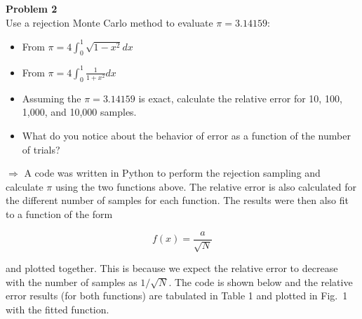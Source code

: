 \documentclass[10pt]{article}
\begin{document}
%
%
%

\newpage
\noindent \textbf{Problem 2}\\
Use a rejection Monte Carlo method to evaluate $\pi = 3.14159$:

\begin{itemize}
	\item From $\pi = 4 \int_0^1 \sqrt{1-x^2} dx$
	\item From $\pi = 4 \int_0^1 \frac{1}{1+x^2} dx$
	\item Assuming the $\pi = 3.14159$ is exact, calculate the relative error for 10, 100, 1,000, and 10,000 samples.
	\item What do you notice about the behavior of error as a function of the number of trials?
\end{itemize}

$\Rightarrow$ A code was written in Python to perform the rejection sampling and calculate $\pi$ using the two functions above. The relative error is also calculated for the different number of samples for each function. The results were then also fit to a function of the form

\begin{equation*}
	f(x) = \frac{a}{\sqrt{N}}
\end{equation*}

and plotted together. This is because we expect the relative error to decrease with the number of samples as $1/\sqrt{N}$. The code is shown below and the relative error results (for both functions) are tabulated in Table 1 and plotted in Fig.~1 with the fitted function.\\


\end{document}
